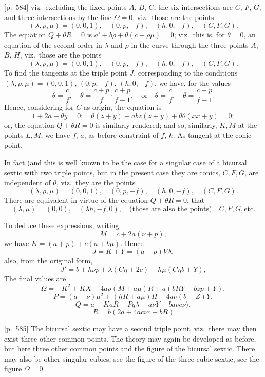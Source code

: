 \documentclass[11pt,a4paper]{article}
\theoremstyle{plain}
\theoremstyle{definition}
\theoremstyle{remark}
\begin{document}
[p.~584] viz.\ excluding the fixed points $A$, $B$, $C$, the six intersections are $C$, $F$, $G$, and three intersections by the line $\Omega = 0$, viz.\ those are the points
\[
(\lambda, \rho, \mu) = (0, 0, 1), \quad (0, p, -f), \quad (h, 0, -f), \quad (C, F, G).
\]
The equation $Q + \theta R = 0$ is $a' + b\rho + \theta(c + \rho \mu) = 0$; viz.\ this is, for $\theta = 0$, an equation of the second order in $\lambda$ and $\rho$ in the curve through the three points $A$, $B$, $H$, viz.\ those are the points
\[
(\lambda, \rho, \mu) = (0, 0, 1), \quad (0, p, -f), \quad (h, 0, -f), \quad (C, F, G).
\]
To find the tangents at the triple point $J$, corresponding to the conditions $(\lambda, \rho, \mu) = (0, 0, 1)$, $(0, p, -f)$, $(h, 0, -f)$, we have, for the values
\[
\theta = \frac{c}{f}, \quad \theta = \frac{c + p}{f} \cdot \frac{c + p}{f - 1}, \quad \text{or}\quad \theta = \frac{c}{f}, \quad \theta = \frac{c + p}{f - 1}.
\]
Hence, considering for $C$ as origin, the equation is
\[
1 + 2a + \theta y = 0; \quad \theta(z + y) + a b z(z + y) + \theta\theta(x x + y) = 0;
\]
or, the equation $Q + \theta R = 0$ is similarly rendered; and so, similarly, $K, M$ at the points $L, M$, we have $f$, $a$, as before constraint of $f$, $h$. As tangent at the conic point.

In fact (and this is well known to be the case for a singular case of a bicursal sextic with two triple points, but in the present case they are conics, $C, F, G$, are independent of $\theta$, viz.\ they are the points
\[
(\lambda, \rho, \mu) = (0, 0, 1), \quad (0, p, -f), \quad (h, 0, -f), \quad (C, F, G).
\]
There are equivalent in virtue of the equation $Q + \theta R = 0$, that
\[
(\lambda, \mu) = (0, 0), \quad (\lambda h, -f, 0), \quad \text{(those are also the points)} \quad C, F, G, \text{etc.}
\]

To deduce these expressions, writing
\[
M = c + 2a(\nu + p),
\]
we have $K = (a + p) + c(a + b\mu)$. Hence
\[
J = K + Y = (a - p)V \lambda,
\]
also, from the original form,
\[
J' = b + h\nu p + \lambda(C\eta + 2c) - h\mu(C\eta b + Y),
\]
The final values are
\[
\Omega = -K^2 + KX + 4a\rho(M + a\mu)R + a(bRY - bzp + Y),
\]
\[
P = (a - \nu)\mu^2 + (h R + a\mu)\Pi - 4a\nu(b - Z)Y,
\]
\[
Q = a + KaR + Pq\lambda - a\nu Y + b a\nu c\nu),
\]
\[
R = b(2a + 4a c\nu c + b R)
\]

\bigskip

[p.~585] The bicursal sextic may have a second triple point, viz.\ there may then exist three other common points. The theory may again be developed as before, but here three other common points and the figure of the bicursal sextic. There may also be other singular cubics, see the figure of the three-cubic sextic, see the figure $\Omega = 0$.
\end{document}
